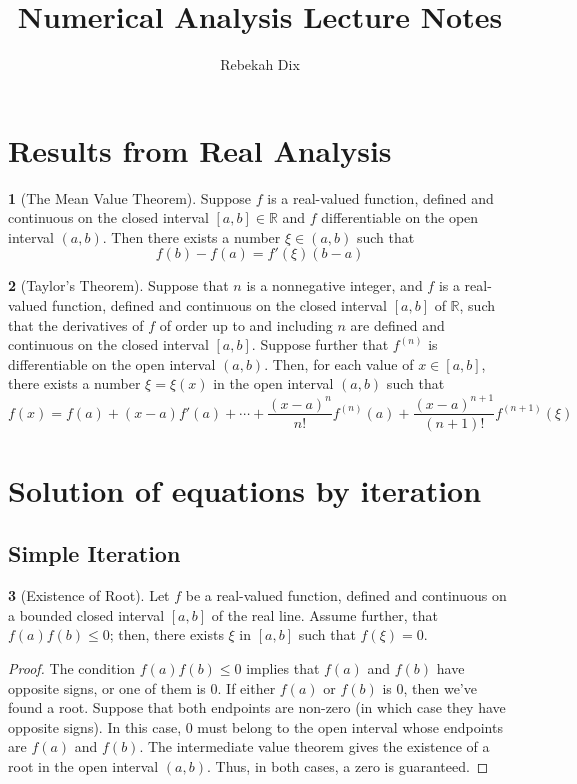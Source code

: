 \documentclass[12pt]{article}
\title{Numerical Analysis Lecture Notes}
\author{Rebekah Dix}
\theoremstyle{definition}
\newtheorem{theorem}{\color{ForestGreen}{\textbf{Theorem}}}
\newcommand{\R}{\mathbb{R}}
\theoremstyle{definition}
\begin{document}
\maketitle
\tableofcontents
\newpage 

\section{Results from Real Analysis}
\begin{theorem}[The Mean Value Theorem]
Suppose $f$ is a real-valued function, defined and continuous on the closed interval $[a,b] \in \R$ and $f$ differentiable on the open interval $(a,b)$. Then there exists a number $\xi \in (a,b)$ such that
\begin{equation}
	f(b) - f(a) = f'(\xi) (b - a)
\end{equation}
\end{theorem}

\begin{theorem}[Taylor's Theorem]
Suppose that $n$ is a nonnegative integer, and $f$ is a real-valued function, defined and continuous on the closed interval $[a,b]$ of $\R$, such that the derivatives of $f$ of order up to and including $n$ are defined and continuous on the closed interval $[a,b]$. Suppose further that $f^{(n)}$ is differentiable on the open interval $(a,b)$. Then, for each value of $x \in [a,b]$, there exists a number $\xi = \xi(x)$ in the open interval $(a,b)$ such that 
\begin{equation}
	f(x) = f(a) + (x-a)f'(a) + \cdots + \frac{(x-a)^n}{n!} f^{(n)}(a) + \frac{(x-a)^{n+1}}{(n+1)!} f^{(n+1)}(\xi)
\end{equation}
\end{theorem}

\section{Solution of equations by iteration}

\subsection{Simple Iteration}
\begin{theorem}[Existence of Root]\label{zeroexists}
Let $f$ be a real-valued function, defined and continuous on a bounded closed interval $[a,b]$ of the real line. Assume further, that $f(a)f(b) \leq 0$; then, there exists $\xi$ in $[a,b]$ such that $f(\xi) = 0$.
\end{theorem}
\begin{proof}
The condition $f(a)f(b) \leq 0$ implies that $f(a)$ and $f(b)$ have opposite signs, or one of them is $0$. If either $f(a)$ or $f(b)$ is $0$, then we've found a root. Suppose that both endpoints are non-zero (in which case they have opposite signs). In this case, $0$ must belong to the open interval whose endpoints are $f(a)$ and $f(b)$. The intermediate value theorem gives the existence of a root in the open interval $(a,b)$. Thus, in both cases, a zero is guaranteed. 
\end{proof}
\end{document}
